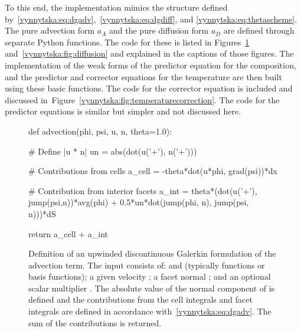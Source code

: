To this end, the implementation mimics the structure defined
by~\eqref{vynnytska:eq:dgadv},~\eqref{vynnytska:eq:dgdiff}, and
\eqref{vynnytska:eq:thetascheme}. The pure advection form $a_A$ and
the pure diffusion form $a_D$ are defined through separate Python
functions. The code for these is listed in
Figures~\ref{vynnytska:fig:advection}
and~\ref{vynnytska:fig:diffusion} and explained in the captions of
those figures. The implementation of the weak forms of the predictor
equation for the composition, and the predictor and corrector
equations for the temperature are then built using these basic functions. The
code for the corrector equation is included and discussed
in~Figure~\ref{vynnytska:fig:temperaturecorrection}. The code for the
predictor equations is similar but simpler and not discussed
here.
\begin{figure}
  \begin{center}
    \begin{python}
def advection(phi, psi, u, n, theta=1.0):

    # Define |u * n|
    un = abs(dot(u('+'), n('+')))

    # Contributions from cells
    a_cell = -theta*dot(u*phi, grad(psi))*dx

    # Contribution from interior facets
    a_int = theta*(dot(u('+'), jump(psi,n))*avg(phi)
        + 0.5*un*dot(jump(phi, n), jump(psi, n)))*dS

    return a_cell + a_int
    \end{python}
  \end{center}
  \caption{Definition of an upwinded discontinuous Galerkin
    formulation of the advection term. The input consists of:
     and  (typically functions or basis
    functions); a given velocity ; a facet normal ;
    and an optional scalar multiplier . The absolute
    value of the normal component of  is defined and the
    contributions from the cell integrals and facet integrals are
    defined in accordance with~\eqref{vynnytska:eq:dgadv}. The sum
    of the contributions is returned.}
  \label{vynnytska:fig:advection}
\end{figure}
%
